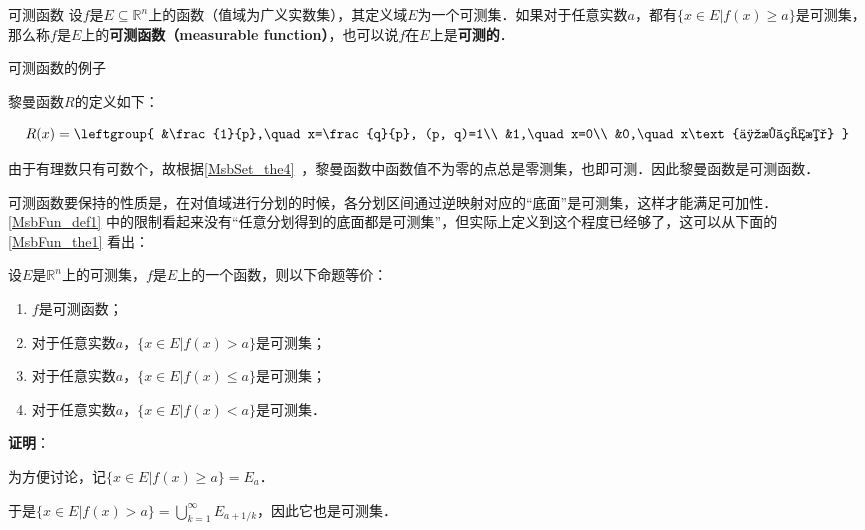 \begin{definition}{可测函数}\label{MsbFun_def1}
设$f$是$E\subseteq\mathbb{R}^n$上的函数（值域为广义实数集），其定义域$E$为一个可测集．如果对于任意实数$a$，都有$\{x\in E|f(x)\geq a\}$是可测集，那么称$f$是$E$上的\textbf{可测函数（measurable function）}，也可以说$f$在$E$上是\textbf{可测的}．
\end{definition}

\begin{example}{可测函数的例子}

黎曼函数$R$的定义如下：

\begin{equation}
R(x)=
\leftgroup{
        &\frac{1}{p},\quad x=\frac{q}{p}, (p, q)=1\\
        &1,\quad x=0\\
        &0,\quad x\text{为无理数}
}
\end{equation}

由于有理数只有可数个，故根据\autoref{MsbSet_the4}~，黎曼函数中函数值不为零的点总是零测集，也即可测．因此黎曼函数是可测函数．

\end{example}









可测函数要保持的性质是，在对值域进行分划的时候，各分划区间通过逆映射对应的“底面”是可测集，这样才能满足可加性．\autoref{MsbFun_def1} 中的限制看起来没有“任意分划得到的底面都是可测集”，但实际上定义到这个程度已经够了，这可以从下面的\autoref{MsbFun_the1} 看出：


\begin{theorem}{}\label{MsbFun_the1}
设$E$是$\mathbb{R}^n$上的可测集，$f$是$E$上的一个函数，则以下命题等价：
\begin{enumerate}
\item $f$是可测函数；
\item 对于任意实数$a$，$\{x\in E|f(x)>a\}$是可测集；
\item 对于任意实数$a$，$\{x\in E|f(x)\leq a\}$是可测集；
\item 对于任意实数$a$，$\{x\in E|f(x)<a\}$是可测集．
\end{enumerate}
\end{theorem}

\textbf{证明}：

为方便讨论，记$\{x\in E|f(x)\geq a\}=E_a$．

于是$\{x\in E|f(x)>a\}=\bigcup_{k=1}^\infty E_{a+1/k}$，因此它也是可测集．

